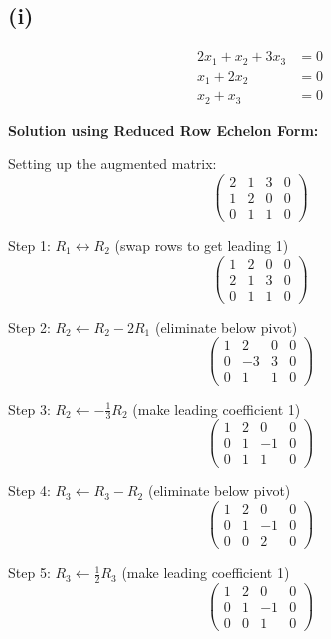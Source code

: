 \subsection*{(i)}
\begin{align*}
2x_1 + x_2 + 3x_3 &= 0\\
x_1 + 2x_2 &= 0\\
x_2 + x_3 &= 0
\end{align*}

\textbf{Solution using Reduced Row Echelon Form:}

Setting up the augmented matrix:
\[
\left(\begin{array}{ccc|c}
2 & 1 & 3 & 0\\
1 & 2 & 0 & 0\\
0 & 1 & 1 & 0
\end{array}\right)
\]

Step 1: $R_1 \leftrightarrow R_2$ (swap rows to get leading 1)
\[
\left(\begin{array}{ccc|c}
1 & 2 & 0 & 0\\
2 & 1 & 3 & 0\\
0 & 1 & 1 & 0
\end{array}\right)
\]

Step 2: $R_2 \leftarrow R_2 - 2R_1$ (eliminate below pivot)
\[
\left(\begin{array}{ccc|c}
1 & 2 & 0 & 0\\
0 & -3 & 3 & 0\\
0 & 1 & 1 & 0
\end{array}\right)
\]

Step 3: $R_2 \leftarrow -\frac{1}{3}R_2$ (make leading coefficient 1)
\[
\left(\begin{array}{ccc|c}
1 & 2 & 0 & 0\\
0 & 1 & -1 & 0\\
0 & 1 & 1 & 0
\end{array}\right)
\]

Step 4: $R_3 \leftarrow R_3 - R_2$ (eliminate below pivot)
\[
\left(\begin{array}{ccc|c}
1 & 2 & 0 & 0\\
0 & 1 & -1 & 0\\
0 & 0 & 2 & 0
\end{array}\right)
\]

Step 5: $R_3 \leftarrow \frac{1}{2}R_3$ (make leading coefficient 1)
\[
\left(\begin{array}{ccc|c}
1 & 2 & 0 & 0\\
0 & 1 & -1 & 0\\
0 & 0 & 1 & 0
\end{array}\right)
\]

